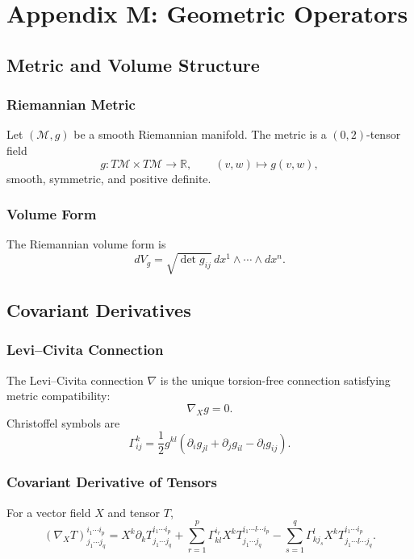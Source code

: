 \chapter*{Appendix M: Geometric Operators}

\section{Metric and Volume Structure}

\subsection{Riemannian Metric}

Let $(\mathcal{M},g)$ be a smooth Riemannian manifold.
The metric is a $(0,2)$-tensor field
\[
g: T\mathcal{M} \times T\mathcal{M} \to \mathbb{R},
\qquad
(v,w) \mapsto g(v,w),
\]
smooth, symmetric, and positive definite.

\subsection{Volume Form}

The Riemannian volume form is
\[
dV_g = \sqrt{\det g_{ij}}\, dx^1\wedge\cdots\wedge dx^n.
\]

\section{Covariant Derivatives}

\subsection{Levi–Civita Connection}

The Levi–Civita connection $\nabla$ is the unique torsion-free connection satisfying metric compatibility:
\[
\nabla_X g = 0.
\]
Christoffel symbols are
\[
\Gamma^k_{ij}
  = \frac12 g^{kl}
    \left( \partial_i g_{jl}
          + \partial_j g_{il}
          - \partial_l g_{ij} \right).
\]

\subsection{Covariant Derivative of Tensors}

For a vector field $X$ and tensor $T$,
\[
(\nabla_X T)^{i_1\cdots i_p}_{j_1\cdots j_q}
= X^k \partial_k T^{i_1\cdots i_p}_{j_1\cdots j_q}
  + \sum_{r=1}^p \Gamma^{i_r}_{kl} X^k
        T^{i_1\cdots l\cdots i_p}_{j_1\cdots j_q}
  - \sum_{s=1}^q \Gamma^l_{kj_s} X^k
        T^{i_1\cdots i_p}_{j_1\cdots l\cdots j_q}.
\]

